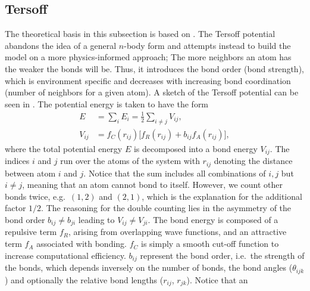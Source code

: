 \subsection{Tersoff}\label{sec:tersoff}




The theoretical basis in this subsection is based on \cite{docs_lammps_tersoff,PhysRevB.37.6991}. The Tersoff potential abandons the idea of a general $n$-body form and attempts
instead to build the model on a more physics-informed approach; The more
neighbors an atom has the weaker the bonds will be. Thus, it introduces the bond
order (bond strength), which is environment specific and decreases with increasing bond coordination (number of neighbors for a given atom). A sketch of the Tersoff potential can be seen in \cite{fig:bond_order}. The potential energy is taken to have the form
\begin{align*}
  E &= \sum_i E_i = \frac{1}{2}\sum_{i \ne j} V_{ij}, \\
  V_{ij} &= f_C(r_{ij}) \big[f_R(r_{ij}) + b_{ij}f_A(r_{ij})  \big],
\end{align*}
where the total potential energy $E$ is decomposed into a bond energy $V_{ij}$.
The indices $i$ and $j$ run over the atoms of the system with $r_{ij}$ denoting
the distance between atom $i$ and $j$. Notice that the sum includes all
combinations of $i,j$ but $i\ne j$, meaning that an atom cannot bond to itself. However, we count other bonds twice, e.g.\ $(1,2)$ and $(2,1)$, which is the
explanation for the additional factor $1/2$. The reasoning for the double counting lies in the asymmetry of the bond order $b_{ij}\ne b_{ji}$ leading to $V_{ij}\ne V_{ji}$.
The bond energy is composed of a repulsive term $f_R$, arising from overlapping
wave functions, and an attractive term $f_A$ associated with bonding. $f_C$ is
simply a smooth cut-off function to increase computational efficiency. $b_{ij}$
represent the bond order, i.e.\ the strength of the bonds, which depends
inversely on the number of bonds, the bond angles ($\theta_{ijk}$) and
optionally the relative bond lengths ($r_{ij}$, $r_{jk}$). Notice that an
